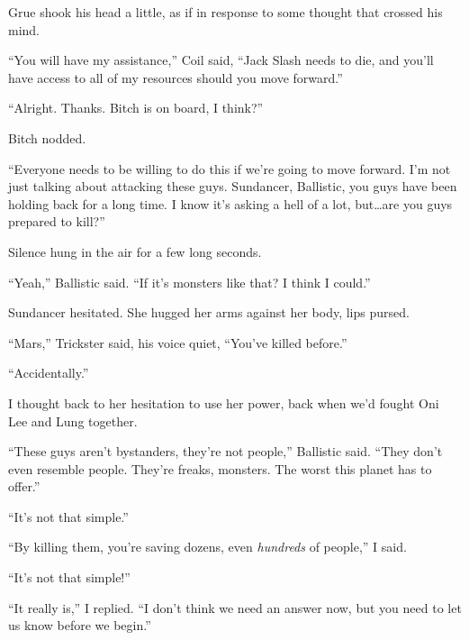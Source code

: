 Grue shook his head a little, as if in response to some thought that crossed his mind.



``You will have my assistance,'' Coil said, ``Jack Slash needs to die, and you'll have access to all of my resources should you move forward.''



``Alright.  Thanks.  Bitch is on board, I think?''



Bitch nodded.



``Everyone needs to be willing to do this if we're going to move forward.  I'm not just talking about attacking these guys.  Sundancer, Ballistic, you guys have been holding back for a long time.  I know it's asking a hell of a lot, but\ldots are you guys prepared to kill?''



Silence hung in the air for a few long seconds.



``Yeah,'' Ballistic said.  ``If it's monsters like that?  I think I could.''



Sundancer hesitated.  She hugged her arms against her body, lips pursed.



``Mars,'' Trickster said, his voice quiet, ``You've killed before.''



``Accidentally.''



I thought back to her hesitation to use her power, back when we'd fought Oni Lee and Lung together.



``These guys aren't bystanders, they're not people,'' Ballistic said.  ``They don't even resemble people.  They're freaks, monsters.  The worst this planet has to offer.''



``It's not that simple.''



``By killing them, you're saving dozens, even \emph{hundreds} of people,'' I said.



``It's not that simple!''



``It really is,'' I replied.  ``I don't think we need an answer now, but you need to let us know before we begin.''



